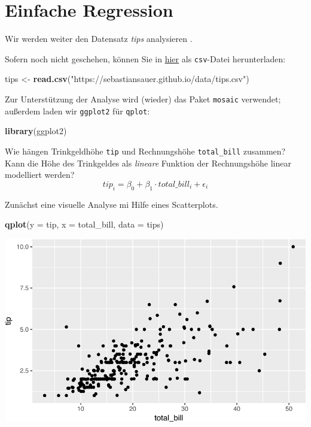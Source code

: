 \documentclass[12pt,ngerman,]{book}
\newenvironment{Shaded}{\begin{snugshade}}{\end{snugshade}}
\newcommand{\KeywordTok}[1]{\textcolor[rgb]{0.13,0.29,0.53}{\textbf{{#1}}}}
\newcommand{\DataTypeTok}[1]{\textcolor[rgb]{0.13,0.29,0.53}{{#1}}}
\newcommand{\StringTok}[1]{\textcolor[rgb]{0.31,0.60,0.02}{{#1}}}
\newcommand{\NormalTok}[1]{{#1}}
\renewenvironment{Shaded}{\begin{kframe}}{\end{kframe}}
\begin{document}
\section{Einfache Regression}\label{einfache-regression}

Wir werden weiter den Datensatz \emph{tips} analysieren
\citep{bryant1995practical}.

Sofern noch nicht geschehen, können Sie in
\href{https://goo.gl/whKjnl}{hier} als \texttt{csv}-Datei herunterladen:

\begin{Shaded}
\begin{Highlighting}[]
\NormalTok{tips <-}\StringTok{ }\KeywordTok{read.csv}\NormalTok{(}\StringTok{"https://sebastiansauer.github.io/data/tips.csv"}\NormalTok{)}
\end{Highlighting}
\end{Shaded}

Zur Unterstützung der Analyse wird (wieder) das Paket \texttt{mosaic}
verwendet; außerdem laden wir \texttt{ggplot2} für \texttt{qplot}:

\begin{Shaded}
\begin{Highlighting}[]
\KeywordTok{library}\NormalTok{(ggplot2)}
\end{Highlighting}
\end{Shaded}

Wie hängen Trinkgeldhöhe \texttt{tip} und Rechnungshöhe
\texttt{total\_bill} zusammen? Kann die Höhe des Trinkgeldes als
\emph{lineare} Funktion der Rechnungshöhe linear modelliert werden?
\[tip_i=\beta_0+\beta_1\cdot total\_bill_i+\epsilon_i\]

Zunächst eine visuelle Analyse mi Hilfe eines Scatterplots.

\begin{Shaded}
\begin{Highlighting}[]
\KeywordTok{qplot}\NormalTok{(}\DataTypeTok{y =} \NormalTok{tip, }\DataTypeTok{x =} \NormalTok{total_bill, }\DataTypeTok{data =} \NormalTok{tips)}
\end{Highlighting}
\end{Shaded}

\begin{center}\includegraphics[width=0.7\linewidth]{071_Regression_files/figure-latex/unnamed-chunk-2-1} \end{center}
\end{document}

